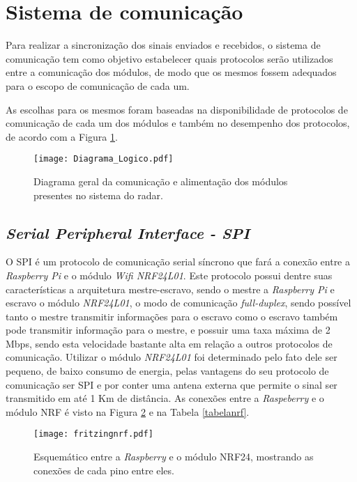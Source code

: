 \section{Sistema de comunicação}
Para realizar a sincronização dos sinais enviados e recebidos, o sistema de comunicação tem como objetivo estabelecer quais protocolos serão utilizados entre a comunicação dos módulos, de modo que os mesmos fossem adequados para o escopo de comunicação de cada um.

As escolhas para os mesmos foram baseadas na disponibilidade de protocolos  de comunicação de cada um dos módulos e também no desempenho dos protocolos, de acordo com a Figura \ref{diagrama_logico}.


\begin{figure}[H]
    \centering
    \texttt{[image: Diagrama\_Logico.pdf]}
    \caption{Diagrama geral da comunicação e alimentação dos módulos presentes no sistema do radar. }
    \label{diagrama_logico}
\end{figure}



\subsection{\emph{Serial Peripheral Interface - SPI}}
    O SPI é um protocolo de comunicação serial síncrono que fará a conexão entre a \emph{Raspberry Pi} e o módulo \emph{Wifi NRF24L01}. Este protocolo possui dentre suas características a arquitetura mestre-escravo, sendo o mestre a \emph{Raspberry Pi} e escravo o módulo \emph{NRF24L01}, o modo de comunicação \emph{full-duplex}, sendo possível tanto o mestre transmitir informações para o escravo como o escravo também pode transmitir informação para o mestre, e possuir uma taxa máxima de 2 Mbps, sendo esta velocidade bastante alta em relação a outros protocolos de comunicação.
    Utilizar o módulo \emph{NRF24L01} foi determinado pelo fato dele ser pequeno, de baixo consumo de energia, pelas vantagens do seu protocolo de comunicação ser SPI e por conter uma antena externa que permite o sinal ser transmitido em até 1 Km de distância.
    As conexões entre a \emph{Raspeberry} e o módulo NRF é visto na Figura \ref{fritizingnrf} e na Tabela \ref{tabelanrf}.
    
    \begin{figure}[H]
    \centering
    \texttt{[image: fritzingnrf.pdf]}
    \caption{Esquemático entre a \emph{Raspberry} e o módulo NRF24, mostrando as conexões de cada pino entre eles.}
    \label{fritizingnrf}
\end{figure}

